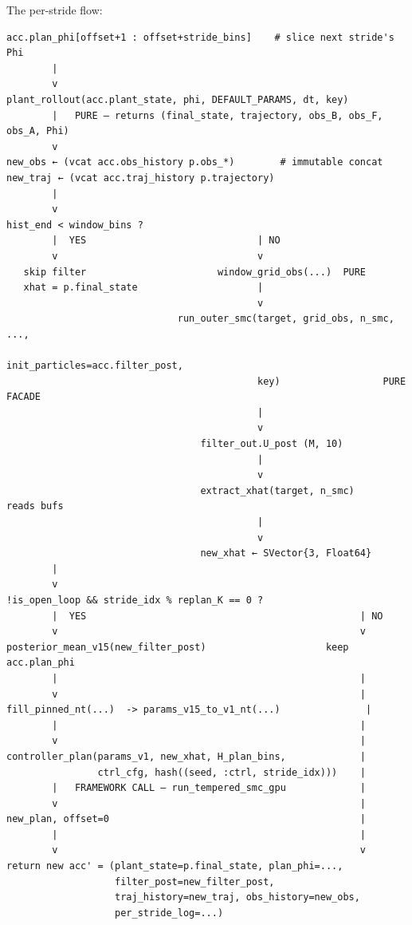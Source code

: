 \documentclass[11pt,a4paper]{article}
\begin{document}
The per-stride flow:

\begin{verbatim}
acc.plan_phi[offset+1 : offset+stride_bins]    # slice next stride's Phi
        |
        v
plant_rollout(acc.plant_state, phi, DEFAULT_PARAMS, dt, key)
        |   PURE — returns (final_state, trajectory, obs_B, obs_F, obs_A, Phi)
        v
new_obs ← (vcat acc.obs_history p.obs_*)        # immutable concat
new_traj ← (vcat acc.traj_history p.trajectory)
        |
        v
hist_end < window_bins ?
        |  YES                              | NO
        v                                   v
   skip filter                       window_grid_obs(...)  PURE
   xhat = p.final_state                     |
                                            v
                              run_outer_smc(target, grid_obs, n_smc, ...,
                                            init_particles=acc.filter_post,
                                            key)                  PURE FACADE
                                            |
                                            v
                                  filter_out.U_post (M, 10)
                                            |
                                            v
                                  extract_xhat(target, n_smc)     reads bufs
                                            |
                                            v
                                  new_xhat ← SVector{3, Float64}
        |
        v
!is_open_loop && stride_idx % replan_K == 0 ?
        |  YES                                                | NO
        v                                                     v
posterior_mean_v15(new_filter_post)                     keep acc.plan_phi
        |                                                     |
        v                                                     |
fill_pinned_nt(...)  -> params_v15_to_v1_nt(...)               |
        |                                                     |
        v                                                     |
controller_plan(params_v1, new_xhat, H_plan_bins,             |
                ctrl_cfg, hash((seed, :ctrl, stride_idx)))    |
        |   FRAMEWORK CALL — run_tempered_smc_gpu             |
        v                                                     |
new_plan, offset=0                                            |
        |                                                     |
        v                                                     v
return new acc' = (plant_state=p.final_state, plan_phi=...,
                   filter_post=new_filter_post,
                   traj_history=new_traj, obs_history=new_obs,
                   per_stride_log=...)
\end{verbatim}
\end{document}
